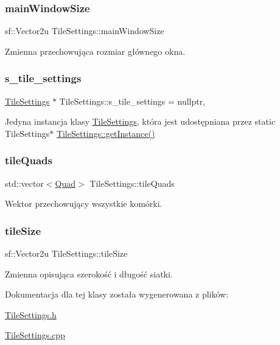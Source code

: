 \subsubsection{\texorpdfstring{main\+Window\+Size}{mainWindowSize}}
{\footnotesize\ttfamily sf\+::\+Vector2u Tile\+Settings\+::main\+Window\+Size}

Zmienna przechowująca rozmiar głównego okna. \mbox{\label{class_tile_settings_a4e06ef1c8909d1e22f82976b9b4162f0}} 
\subsubsection{\texorpdfstring{s\+\_\+tile\+\_\+settings}{s\_tile\_settings}}
{\footnotesize\ttfamily \mbox{\hyperlink{class_tile_settings}{Tile\+Settings}} $\ast$ Tile\+Settings\+::s\+\_\+tile\+\_\+settings = nullptr\hspace{0.3cm}{\ttfamily [static]}, {\ttfamily [private]}}

Jedyna instancja klasy \mbox{\hyperlink{class_tile_settings}{Tile\+Settings}}, która jest udostępniana przez static Tile\+Settings$\ast$ \mbox{\hyperlink{class_tile_settings_a003ae6e78b97855c8592b2b4c0818914}{Tile\+Settings\+::get\+Instance()}} \mbox{\label{class_tile_settings_ac37d7b95a1e2266d38de0a70a907efb3}} 
\subsubsection{\texorpdfstring{tile\+Quads}{tileQuads}}
{\footnotesize\ttfamily std\+::vector$<$\mbox{\hyperlink{class_quad}{Quad}}$>$ Tile\+Settings\+::tile\+Quads}

Wektor przechowujący wszystkie komórki. \mbox{\label{class_tile_settings_ae4be54be3619d21d536ce13b7354f165}} 
\subsubsection{\texorpdfstring{tile\+Size}{tileSize}}
{\footnotesize\ttfamily sf\+::\+Vector2u Tile\+Settings\+::tile\+Size}

Zmienna opisująca szerokość i długość siatki. 

Dokumentacja dla tej klasy została wygenerowana z plików\+:\begin{DoxyCompactItemize}
\item 
\mbox{\hyperlink{_tile_settings_8h}{Tile\+Settings.\+h}}\item 
\mbox{\hyperlink{_tile_settings_8cpp}{Tile\+Settings.\+cpp}}\end{DoxyCompactItemize}
